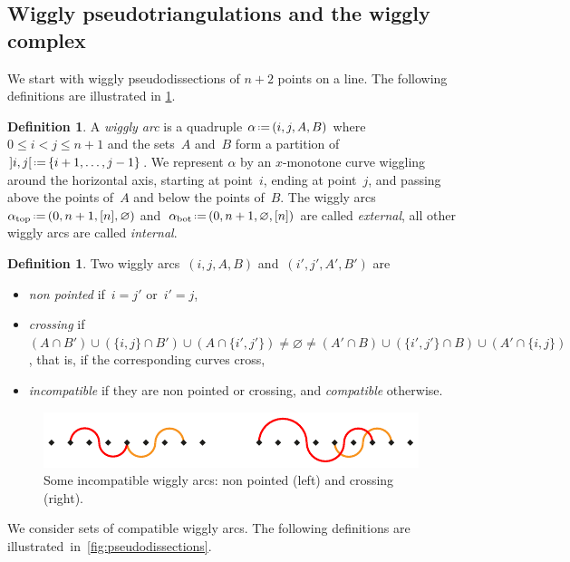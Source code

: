 \documentclass{amsart}
\theoremstyle{definition}
\newtheorem{definition}[theorem]{Definition}
\newcommand{\eqdef}{\mbox{\,\raisebox{0.2ex}{\scriptsize\ensuremath{\mathrm:}}\ensuremath{=}\,}} %
\newcommand{\darkblue}{\color{darkblue}} %
\newcommand{\defn}[1]{\textsl{\darkblue #1}} %
\begin{document}

\subsection{Wiggly pseudotriangulations and the wiggly complex}
\label{subsec:wigglyPseudotriangulations}

We start with wiggly pseudodissections of $n+2$ points on a line.
The following definitions are illustrated in \cref{fig:incompatible}.

\begin{definition}
A \defn{wiggly arc} is a quadruple $\alpha \eqdef (i,j,A,B)$ where $0 \le i < j \le n+1$ and the sets~$A$ and~$B$ form a partition of~${]i,j[} \eqdef \{i+1, \dots, j-1\}$.
We represent $\alpha$ by an $x$-monotone curve wiggling around the horizontal axis, starting at point~$i$, ending at point~$j$, and passing above the points of~$A$ and below the points of~$B$.
The wiggly arcs~$\alpha_\mathrm{top} \eqdef (0, n+1, [n], \varnothing)$ and~$\alpha_\mathrm{bot} \eqdef (0, n+1, \varnothing, [n])$ are called \defn{external}, all other wiggly arcs are called \defn{internal}.
\end{definition}

\begin{definition}
\label{def:compatible}
Two wiggly arcs~$(i,j,A,B)$ and~$(i',j',A',B')$ are 
\begin{itemize}
\item \defn{non pointed} if~$i = j'$ or~$i' = j$,
\item \defn{crossing} if~$(A \cap B') \cup (\{i,j\} \cap B') \cup (A \cap \{i',j'\}) \ne \varnothing \ne (A' \cap B) \cup (\{i',j'\} \cap B) \cup (A' \cap \{i,j\})$, that is, if the corresponding curves cross,
\item \defn{incompatible} if they are non pointed or crossing, and \defn{compatible} otherwise.
\end{itemize}
%
\begin{figure}[b]
\centerline{\includegraphics[scale=1.3]{incompatible}}
\caption{Some incompatible wiggly arcs: non pointed (left) and crossing (right).}
\label{fig:incompatible}
\end{figure}
\end{definition}

We consider sets of compatible wiggly arcs.
The following definitions are illustrated~in~\cref{fig:pseudodissections}.
\end{document}
